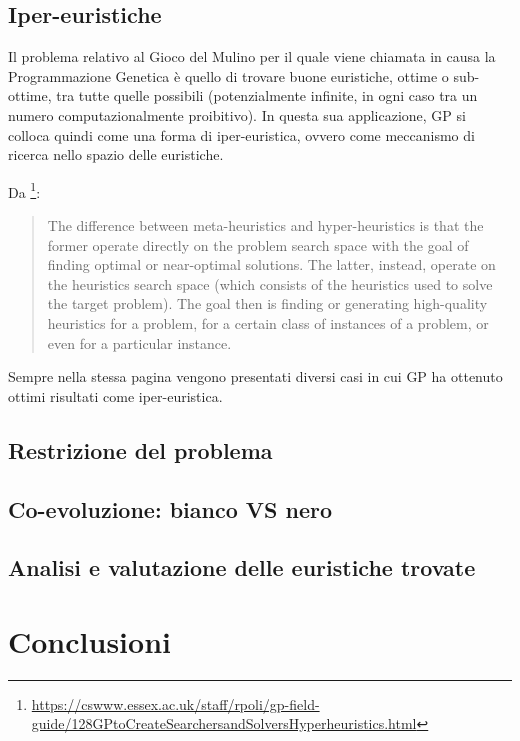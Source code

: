 \documentclass{../llncs}
\begin{document}
\subsection{Iper-euristiche}
Il problema relativo al Gioco del Mulino per il quale viene chiamata in causa la Programmazione Genetica è quello di trovare buone euristiche, ottime o sub-ottime, tra tutte quelle possibili (potenzialmente infinite, in ogni caso tra un numero computazionalmente proibitivo). In questa sua applicazione, GP si colloca quindi come una forma di iper-euristica, ovvero come meccanismo di ricerca nello spazio delle euristiche.

Da \footnote{\url{https://cswww.essex.ac.uk/staff/rpoli/gp-field-guide/128GPtoCreateSearchersandSolversHyperheuristics.html}}:
\begin{quote}
The difference between meta-heuristics and hyper-heuristics is that the former operate directly on the problem search space with the goal of finding optimal or near-optimal solutions. The latter, instead, operate on the heuristics search space (which consists of the heuristics used to solve the target problem). The goal then is finding or generating high-quality heuristics for a problem, for a certain class of instances of a problem, or even for a particular instance.
\end{quote}
Sempre nella stessa pagina vengono presentati diversi casi in cui GP ha ottenuto ottimi risultati come iper-euristica.

\subsection{Restrizione del problema}
\subsection{Co-evoluzione: bianco VS nero}
\subsection{Analisi e valutazione delle euristiche trovate}

\section{Conclusioni}
\end{document}
